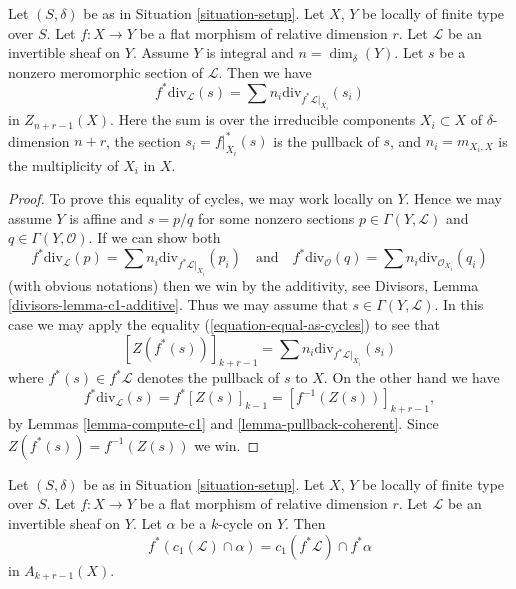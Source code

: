 \begin{lemma}
\label{lemma-prepare-flat-pullback-cap-c1}
Let $(S, \delta)$ be as in Situation \ref{situation-setup}.
Let $X$, $Y$ be locally of finite type over $S$.
Let $f : X \to Y$ be a flat morphism of relative dimension $r$.
Let $\mathcal{L}$ be an invertible sheaf on $Y$.
Assume $Y$ is integral and $n = \dim_\delta(Y)$.
Let $s$ be a nonzero meromorphic section of $\mathcal{L}$.
Then we have
$$
f^*\text{div}_\mathcal{L}(s) = \sum n_i\text{div}_{f^*\mathcal{L}|_{X_i}}(s_i)
$$
in $Z_{n + r - 1}(X)$. Here the sum is over the irreducible
components $X_i \subset X$ of $\delta$-dimension $n + r$,
the section $s_i = f|_{X_i}^*(s)$ is the pullback of $s$, and
$n_i = m_{X_i, X}$ is the multiplicity of $X_i$ in $X$.
\end{lemma}

\begin{proof}
To prove this equality of cycles, we may work locally on $Y$.
Hence we may assume $Y$ is affine and $s = p/q$ for some nonzero
sections $p \in \Gamma(Y, \mathcal{L})$ and $q \in \Gamma(Y, \mathcal{O})$.
If we can show both
$$
f^*\text{div}_\mathcal{L}(p) =
\sum n_i\text{div}_{f^*\mathcal{L}|_{X_i}}(p_i)
\quad\text{and}\quad
f^*\text{div}_\mathcal{O}(q) =
\sum n_i\text{div}_{\mathcal{O}_{X_i}}(q_i)
$$
(with obvious notations) then we win by the
additivity, see Divisors, Lemma \ref{divisors-lemma-c1-additive}.
Thus we may assume that $s \in \Gamma(Y, \mathcal{L})$.
In this case we may apply the equality
(\ref{equation-equal-as-cycles}) to see that
$$
[Z(f^*(s))]_{k + r - 1} =
\sum n_i\text{div}_{f^*\mathcal{L}|_{X_i}}(s_i)
$$
where $f^*(s) \in f^*\mathcal{L}$ denotes the pullback of $s$ to $X$.
On the other hand we have
$$
f^*\text{div}_\mathcal{L}(s) = f^*[Z(s)]_{k - 1}
= [f^{-1}(Z(s))]_{k + r - 1},
$$
by Lemmas \ref{lemma-compute-c1} and \ref{lemma-pullback-coherent}.
Since $Z(f^*(s)) = f^{-1}(Z(s))$ we win.
\end{proof}

\begin{lemma}
\label{lemma-flat-pullback-cap-c1}
Let $(S, \delta)$ be as in Situation \ref{situation-setup}.
Let $X$, $Y$ be locally of finite type over $S$.
Let $f : X \to Y$ be a flat morphism of relative dimension $r$.
Let $\mathcal{L}$ be an invertible sheaf on $Y$.
Let $\alpha$ be a $k$-cycle on $Y$.
Then
$$
f^*(c_1(\mathcal{L}) \cap \alpha) = c_1(f^*\mathcal{L}) \cap f^*\alpha
$$
in $A_{k + r - 1}(X)$.
\end{lemma}

